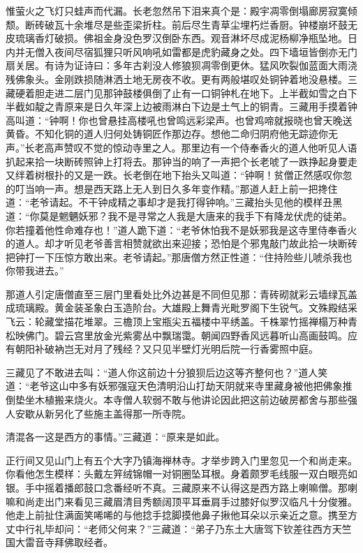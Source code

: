 \documentclass[12pt,UTF8]{ctexbook}
\begin{document}
{	惟萤火之飞灯只蛙声而代漏。长老忽然吊下泪来真个是：殿宇凋零倒塌廊房寂寞倾颓。断砖破瓦十余堆尽是些歪梁折柱。前后尽生青草尘埋朽烂香厨。钟楼崩坏鼓无皮琉璃香灯破损。佛祖金身没色罗汉倒卧东西。观音淋坏尽成泥杨柳净瓶坠地。日内并无僧入夜间尽宿狐狸只听风响吼如雷都是虎豹藏身之处。四下墙垣皆倒亦无门扇关居。有诗为证诗曰：多年古刹没人修狼狈凋零倒更休。猛风吹裂伽蓝面大雨浇残佛象头。金刚跌损随淋洒土地无房夜不收。更有两般堪叹处铜钟着地没悬楼。三藏硬着胆走进二层门见那钟鼓楼俱倒了止有一口铜钟札在地下。上半截如雪之白下半截如靛之青原来是日久年深上边被雨淋白下边是土气上的铜青。三藏用手摸着钟高叫道：“钟啊！你也曾悬挂高楼吼也曾鸣远彩梁声。也曾鸡啼就报晓也曾天晚送黄昏。不知化铜的道人归何处铸铜匠作那边存。想他二命归阴府他无踪迹你无声。”长老高声赞叹不觉的惊动寺里之人。那里边有一个侍奉香火的道人他听见人语扒起来拾一块断砖照钟上打将去。那钟当的响了一声把个长老唬了一跌挣起身要走又绊着树根扑的又是一跌。长老倒在地下抬头又叫道：“钟啊！贫僧正然感叹你忽的叮当响一声。想是西天路上无人到日久多年变作精。”那道人赶上前一把搀住道：“老爷请起。不干钟成精之事却才是我打得钟响。”三藏抬头见他的模样丑黑道：“你莫是魍魉妖邪？我不是寻常之人我是大唐来的我手下有降龙伏虎的徒弟。你若撞着他性命难存也！”道人跪下道：“老爷休怕我不是妖邪我是这寺里侍奉香火的道人。却才听见老爷善言相赞就欲出来迎接；恐怕是个邪鬼敲门故此拾一块断砖把钟打一下压惊方敢出来。老爷请起。”那唐僧方然正性道：“住持险些儿唬杀我也你带我进去。”
	
	那道人引定唐僧直至三层门里看处比外边甚是不同但见那：青砖砌就彩云墙绿瓦盖成琉璃殿。黄金装圣象白玉造阶台。大雄殿上舞青光毗罗阁下生锐气。文殊殿结采飞云：轮藏堂描花堆翠。三檐顶上宝瓶尖五福楼中平绣盖。千株翠竹摇禅榻万种青松映佛门。碧云宫里放金光紫雾丛中飘瑞霭。朝闻四野香风远暮听山高画鼓鸣。应有朝阳补破衲岂无对月了残经？又只见半壁灯光明后院一行香雾照中庭。
	
	三藏见了不敢进去叫：“道人你这前边十分狼狈后边这等齐整何也？”道人笑道：“老爷这山中多有妖邪强寇天色清明沿山打劫天阴就来寺里藏身被他把佛象推倒垫坐木植搬来烧火。本寺僧人软弱不敢与他讲论因此把这前边破房都舍与那些强人安歇从新另化了些施主盖得那一所寺院。
	
	清混各一这是西方的事情。”三藏道：“原来是如此。
	
	正行间又见山门上有五个大字乃镇海禅林寺。才举步跨入门里忽见一个和尚走来。你看他怎生模样：头戴左笄绒锦帽一对铜圈坠耳根。身着颇罗毛线服一双白眼亮如银。手中摇着播郎鼓口念番经听不真。三藏原来不认得这是西方路上喇嘛僧。那喇嘛和尚走出门来看见三藏眉清目秀额阔顶平耳垂肩手过膝好似罗汉临凡十分俊雅。他走上前扯住满面笑唏唏的与他捻手捻脚摸他鼻子揪他耳朵以示亲近之意。携至方丈中行礼毕却问：“老师父何来？”三藏道：“弟子乃东土大唐驾下钦差往西方天竺国大雷音寺拜佛取经者。
	
}
\end{document}
